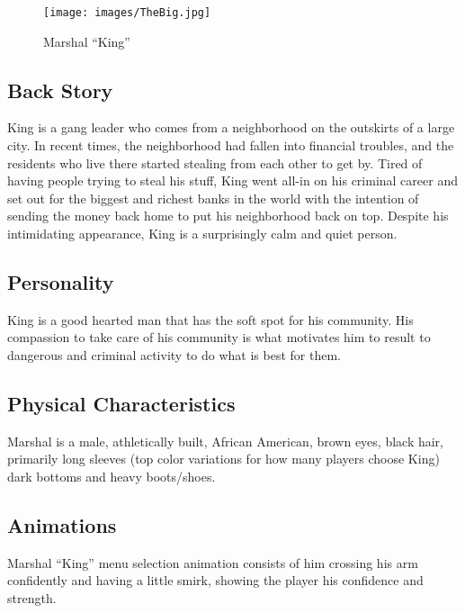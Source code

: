 \documentclass[10pt]{report}
\begin{document}
\begin{multicols}{2}
    \begin{figure}[H]
        \centering
        \texttt{[image: images/TheBig.jpg]}
        \caption{Marshal ``King''}
    \end{figure}
    
    \subsection{Back Story}

    King is a gang leader who comes from a neighborhood on the outskirts of a large city. In recent times, the neighborhood had fallen into financial troubles, and the residents who live there started stealing from each other to get by. Tired of having people trying to steal his stuff, King went all-in on his criminal career and set out for the biggest and richest banks in the world with the intention of sending the money back home to put his neighborhood back on top. Despite his intimidating appearance, King is a surprisingly calm and quiet person. 
    
    \subsection{Personality}
    
    King is a good hearted man that has the soft spot for his community. His compassion to take care of his community is what motivates him to result to dangerous and criminal activity to do what is best for them.
    
    \subsection{Physical Characteristics}
    
    Marshal is a male, athletically built, African American, brown eyes, black hair, primarily long sleeves (top color variations for how many players choose King) dark bottoms and heavy boots/shoes.
    
    \subsection{Animations}
    
    Marshal “King” menu selection animation consists of him crossing his arm confidently and having a little smirk, showing the player his confidence and strength.
    

\end{multicols}
\end{document}
